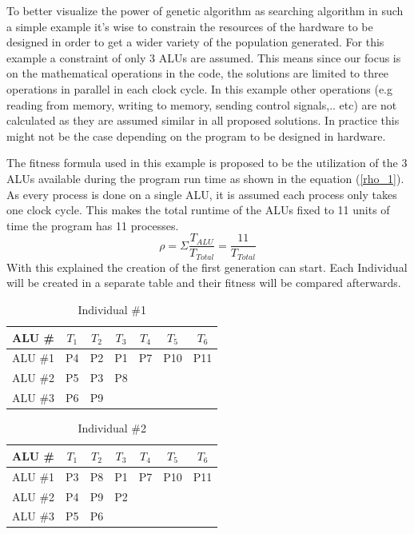 \documentclass[conference]{IEEEtran}
\begin{document}
To better visualize the power of genetic algorithm as searching algorithm in such a simple example it's wise to constrain the resources of the hardware to be designed in order to get a wider variety of the population generated. For this example a constraint of only 3 ALUs are assumed. This means since our focus is on the mathematical operations in the code, the solutions are limited to three operations in parallel in each clock cycle. In this example other operations (e.g reading from memory, writing to memory, sending control signals,.. etc) are not calculated as they are assumed similar in all proposed solutions. In practice this might not be the case depending on the program to be designed in hardware.

The fitness formula used in this example is proposed to be the utilization of the 3 ALUs available during the program run time as shown in the equation (\ref{rho_1}). As every process is done on a single ALU, it is assumed each process only takes one clock cycle. This makes the total runtime of the ALUs fixed to 11 units of time the program has 11 processes.
\begin{equation}
    \rho=\Sigma\frac{T_{ALU}}{T_{Total}}=\frac{11}{T_{Total}}
    \label{rho_1}
\end{equation}
With this explained the creation of the first generation can start. Each Individual will be created in a separate table and their fitness will be compared afterwards.
\begin{table}[h!]
    \centering
    \begin{tabular}{|c|c|c|c|c|c|c|}
    \hline
    ALU \#  & $T_1$ & $T_2$ &  $T_3$& $T_4$ & $T_5$ & $T_6$\\
    \hline
       ALU \#1  & P4 & P2 &  P1& P7 & P10 & P11\\
       \hline
       ALU \#2  &  P5 & P3 & P8 &  &  & \\
       \hline
       ALU \#3  & P6 & P9  &  &  &  & \\
       \hline
    \end{tabular}
           \vspace{2pt}
    \caption{Individual \#1}
    \label{tab:Individual1}
\end{table}
\begin{table}[h!]
    \centering
    \begin{tabular}{|c|c|c|c|c|c|c|}
        \hline
    ALU \#  & $T_1$ & $T_2$ &  $T_3$& $T_4$ & $T_5$ & $T_6$\\
    \hline
       ALU \#1  & P3 & P8 &  P1& P7 & P10 & P11\\
       \hline
       ALU \#2  &  P4 & P9 & P2 &  &  & \\
       \hline
       ALU \#3  & P5 & P6  &  &  &  & \\
       \hline
    \end{tabular}
           \vspace{2pt}
    \caption{Individual \#2}
    \label{tab:Individual2}
\end{table}
\end{document}

